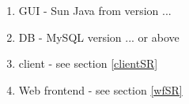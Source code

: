\begin{enumerate}
	\item GUI - Sun Java from version ... \attention
	\item DB - MySQL version ... or above \attention
	\item client - see section \ref{clientSR} \attention
	\item Web frontend - see section \ref{wfSR} \attention
\end{enumerate}
